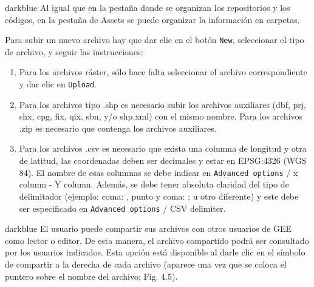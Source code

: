 \documentclass[
  12pt,
  letterpaper,
  twoside]{book}
\providecommand{\tightlist}{%
  \setlength{\itemsep}{0pt}\setlength{\parskip}{0pt}}
\begin{document}
\begin{bluebox2}

\begin{awesomeblock}{5pt}{\faLightbulb}{darkblue}
Al igual que en la pestaña donde se organizan los repositorios y los códigos, en la pestaña de Assets se puede organizar la información en carpetas.

\end{awesomeblock}

\end{bluebox2}

Para subir un nuevo archivo hay que dar clic en el botón \texttt{New}, seleccionar el tipo de archivo, y seguir las instrucciones:

\begin{enumerate}
\def\labelenumi{\arabic{enumi}.}
\tightlist
\item
  Para los archivos ráster, sólo hace falta seleccionar el archivo correspondiente y dar clic en \texttt{Upload}.
\item
  Para los archivos tipo .shp es necesario subir los archivos auxiliares (dbf, prj, shx, cpg, fix, qix, sbn, y/o shp.xml) con el mismo nombre. Para los archivos .zip es necesario que contenga los archivos auxiliares.
\item
  Para los archivos .csv es necesario que exista una columna de longitud y otra de latitud, las coordenadas deben ser decimales y estar en EPSG:4326 (WGS 84). El nombre de esas columnas se debe indicar en \texttt{Advanced\ options} / x column - Y column. Además, se debe tener absoluta claridad del tipo de delimitador (ejemplo: coma: , punto y coma: ; u otro diferente) y este debe ser especificado en \texttt{Advanced\ options} / CSV delimiter.
\end{enumerate}

\begin{bluebox2}

\begin{awesomeblock}{5pt}{\faLightbulb}{darkblue}
El usuario puede compartir sus archivos con otros usuarios de GEE como lector o editor. De esta manera, el archivo compartido podrá ser consultado por los usuarios indicados. Esta opción está disponible al darle clic en el símbolo de compartir a la derecha de cada archivo (aparece una vez que se coloca el puntero sobre el nombre del archivo; Fig. 4.5).

\end{awesomeblock}

\end{bluebox2}
\end{document}
